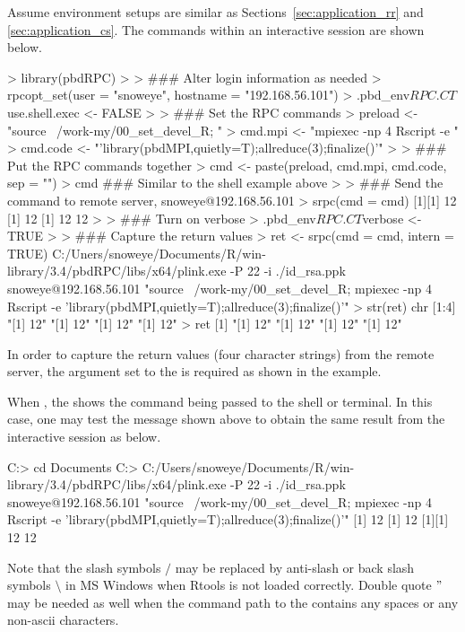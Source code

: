 Assume environment setups are similar as Sections~\ref{sec:application_rr} and
\ref{sec:application_cs}.
The  commands within an interactive  session
are shown below.
\begin{Code}[title=\pkg{pbdRPC} in local and \pkg{pbdMPI} in remote]
> library(pbdRPC)
>
> ### Alter login information as needed
> rpcopt_set(user = "snoweye", hostname = "192.168.56.101")
> .pbd_env$RPC.CT$use.shell.exec <- FALSE
>
> ### Set the RPC commands
> preload <- "source ~/work-my/00_set_devel_R; "
> cmd.mpi <- "mpiexec -np 4 Rscript -e "
> cmd.code <- "'library(pbdMPI,quietly=T);allreduce(3);finalize()'"
>
> ### Put the RPC commands together
> cmd <- paste(preload, cmd.mpi, cmd.code, sep = "")
> cmd  ### Similar to the shell example above
>
> ### Send the command to remote server, snoweye@192.168.56.101
> srpc(cmd = cmd)
[1][1] 12
[1] 12
[1] 12
12
>
> ### Turn on verbose
> .pbd_env$RPC.CT$verbose <- TRUE
>
> ### Capture the return values
> ret <- srpc(cmd = cmd, intern = TRUE)
C:/Uners/snoweye/Documents/R/win-library/3.4/pbdRPC/libs/x64/plink.exe -P 22 -i ./id_rsa.ppk  snoweye@192.168.56.101 "source ~/work-my/00_set_devel_R; mpiexec -np 4 Rscript -e 'library(pbdMPI,quietly=T);allreduce(3);finalize()'"
> str(ret)
 chr [1:4] "[1] 12" "[1] 12" "[1] 12" "[1] 12"
> ret
[1] "[1] 12" "[1] 12" "[1] 12" "[1] 12"
\end{Code}
In order to capture the return values (four character strings) from the
remote server, the argument  set to the 
is required as shown in the example.

When , the  shows the command being passed
to the shell or terminal. In this case, one may test the message shown above
to obtain the same result from the interactive  session as
below.
\begin{Command}[title=From a \code{cmd.exe} command prompt windows]
C:\Users\snoweye> cd Documents
C:\Users\snoweye\Documents> 
C:/Users/snoweye/Documents/R/win-library/3.4/pbdRPC/libs/x64/plink.exe -P 22 -i ./id_rsa.ppk  snoweye@192.168.56.101 "source ~/work-my/00_set_devel_R; mpiexec -np 4 Rscript -e 'library(pbdMPI,quietly=T);allreduce(3);finalize()'"
[1] 12
[1] 12
[1][1] 12
 12
\end{Command}
Note that the slash symbols $/$ may be replaced by anti-slash or back slash
symbols $\setminus$ in MS Windows when Rtools is not loaded correctly.
Double quote $"$ may be needed as well when the command path to the
 contains any spaces or any non-ascii characters.

